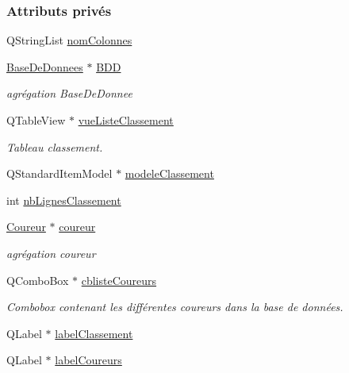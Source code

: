\subsubsection*{Attributs privés}
\begin{DoxyCompactItemize}
\item 
Q\+String\+List \hyperlink{class_i_h_m_resultats_cross_abfda0d5dc4b65c0525a94a74faf68ce0}{nom\+Colonnes}
\item 
\hyperlink{class_base_de_donnees}{Base\+De\+Donnees} $\ast$ \hyperlink{class_i_h_m_resultats_cross_a3f27f95ca0fb27d1a46814d2fddfc3b1}{B\+DD}
\begin{DoxyCompactList}\small\item\em agrégation Base\+De\+Donnee \end{DoxyCompactList}\item 
Q\+Table\+View $\ast$ \hyperlink{class_i_h_m_resultats_cross_a8f35fc63f8c3a1351658d3148daf13e0}{vue\+Liste\+Classement}
\begin{DoxyCompactList}\small\item\em Tableau classement. \end{DoxyCompactList}\item 
Q\+Standard\+Item\+Model $\ast$ \hyperlink{class_i_h_m_resultats_cross_a9d4e02948f64b6d9fef422d7f5a2b9b5}{modele\+Classement}
\item 
int \hyperlink{class_i_h_m_resultats_cross_a696f826387c8fa8b9925ca468a52482e}{nb\+Lignes\+Classement}
\item 
\hyperlink{class_coureur}{Coureur} $\ast$ \hyperlink{class_i_h_m_resultats_cross_ab637383c58d9ce784aec696ccd69d709}{coureur}
\begin{DoxyCompactList}\small\item\em agrégation coureur \end{DoxyCompactList}\item 
Q\+Combo\+Box $\ast$ \hyperlink{class_i_h_m_resultats_cross_ae1190e783fc117504abf614fe170ad54}{cbliste\+Coureurs}
\begin{DoxyCompactList}\small\item\em Combobox contenant les différentes coureurs dans la base de données. \end{DoxyCompactList}\item 
Q\+Label $\ast$ \hyperlink{class_i_h_m_resultats_cross_a455bc28e3605cd327067be2db255c911}{label\+Classement}
\item 
Q\+Label $\ast$ \hyperlink{class_i_h_m_resultats_cross_a0cec9448e3ac680fd93cff9c4c709e1b}{label\+Coureurs}
\end{DoxyCompactItemize}


